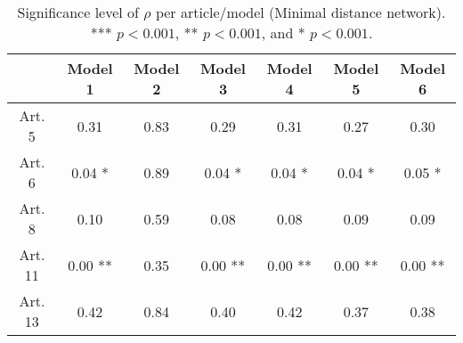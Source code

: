 \begin{table}[ht]
\centering
\begin{tabular}{ccccccc}
  \toprule
 & Model 1 & Model 2 & Model 3 & Model 4 & Model 5 & Model 6 \\ 
  \midrule
Art. 5 & 0.31   & 0.83   & 0.29   & 0.31   & 0.27   & 0.30   \\ 
   \midrule
Art. 6 & 0.04 * & 0.89   & 0.04 * & 0.04 * & 0.04 * & 0.05 * \\ 
   \midrule
Art. 8 & 0.10   & 0.59   & 0.08   & 0.08   & 0.09   & 0.09   \\ 
   \midrule
Art. 11 & 0.00 ** & 0.35   & 0.00 ** & 0.00 ** & 0.00 ** & 0.00 ** \\ 
   \midrule
Art. 13 & 0.42   & 0.84   & 0.40   & 0.42   & 0.37   & 0.38   \\ 
   \bottomrule
\end{tabular}
\caption{Significance level of $\rho$ per article/model (Minimal distance network). *** $p < 0.001$, ** $p < 0.001$, and * $p < 0.001$.} 
\end{table}
